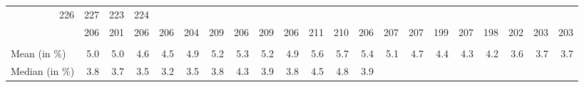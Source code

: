 \begin{tabular}{lllllllllllllllllllll}
  \multicolumn{1}{r}{226} &
  \multicolumn{1}{r}{227} &
  \multicolumn{1}{r}{223} &
  \multicolumn{1}{r}{224} \\
\multicolumn{1}{l}{\hspace{1em}{$\#$ origin countries}} &
  \multicolumn{1}{|r}{206} &
  \multicolumn{1}{r}{201} &
  \multicolumn{1}{r}{206} &
  \multicolumn{1}{r}{206} &
  \multicolumn{1}{r}{204} &
  \multicolumn{1}{r}{209} &
  \multicolumn{1}{r}{206} &
  \multicolumn{1}{r}{209} &
  \multicolumn{1}{r}{206} &
  \multicolumn{1}{r}{211} &
  \multicolumn{1}{r}{210} &
  \multicolumn{1}{r}{206} &
  \multicolumn{1}{r}{207} &
  \multicolumn{1}{r}{207} &
  \multicolumn{1}{r}{199} &
  \multicolumn{1}{r}{207} &
  \multicolumn{1}{r}{198} &
  \multicolumn{1}{r}{202} &
  \multicolumn{1}{r}{203} &
  \multicolumn{1}{r}{203} \\
\multicolumn{1}{l}{\hspace{1em}{\textit{Observed transport costs}}} &
  \multicolumn{1}{|r}{} &
  \multicolumn{1}{r}{} &
  \multicolumn{1}{r}{} &
  \multicolumn{1}{r}{} &
  \multicolumn{1}{r}{} &
  \multicolumn{1}{r}{} &
  \multicolumn{1}{r}{} &
  \multicolumn{1}{r}{} &
  \multicolumn{1}{r}{} &
  \multicolumn{1}{r}{} &
  \multicolumn{1}{r}{} &
  \multicolumn{1}{r}{} &
  \multicolumn{1}{r}{} &
  \multicolumn{1}{r}{} &
  \multicolumn{1}{r}{} &
  \multicolumn{1}{r}{} &
  \multicolumn{1}{r}{} &
  \multicolumn{1}{r}{} &
  \multicolumn{1}{r}{} &
  \multicolumn{1}{r}{} \\
\multicolumn{1}{l}{\hspace{2em}Mean (in $\%$)} &
  \multicolumn{1}{|r}{5.0} &
  \multicolumn{1}{r}{5.0} &
  \multicolumn{1}{r}{4.6} &
  \multicolumn{1}{r}{4.5} &
  \multicolumn{1}{r}{4.9} &
  \multicolumn{1}{r}{5.2} &
  \multicolumn{1}{r}{5.3} &
  \multicolumn{1}{r}{5.2} &
  \multicolumn{1}{r}{4.9} &
  \multicolumn{1}{r}{5.6} &
  \multicolumn{1}{r}{5.7} &
  \multicolumn{1}{r}{5.4} &
  \multicolumn{1}{r}{5.1} &
  \multicolumn{1}{r}{4.7} &
  \multicolumn{1}{r}{4.4} &
  \multicolumn{1}{r}{4.3} &
  \multicolumn{1}{r}{4.2} &
  \multicolumn{1}{r}{3.6} &
  \multicolumn{1}{r}{3.7} &
  \multicolumn{1}{r}{3.7} \\
\multicolumn{1}{l}{\hspace{2em}Median (in $\%$)} &
  \multicolumn{1}{|r}{3.8} &
  \multicolumn{1}{r}{3.7} &
  \multicolumn{1}{r}{3.5} &
  \multicolumn{1}{r}{3.2} &
  \multicolumn{1}{r}{3.5} &
  \multicolumn{1}{r}{3.8} &
  \multicolumn{1}{r}{4.3} &
  \multicolumn{1}{r}{3.9} &
  \multicolumn{1}{r}{3.8} &
  \multicolumn{1}{r}{4.5} &
  \multicolumn{1}{r}{4.8} &
  \multicolumn{1}{r}{3.9} &

\end{tabular}
